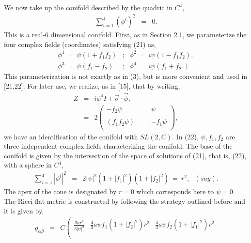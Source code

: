 \documentclass[a4paper,12pt]{article}
\begin{document}
{{\vspace{1.0cm}

{}

\vspace{0.5cm}

We now take up the conifold described by the quadric in $C^4$,
\begin{eqnarray}
\sum_{i=1}^{4} ({\phi}^i)^2 &=& 0.
\end{eqnarray}
This is a real-6 dimensional conifold. First, as in Section 2.1, we parameterize
the four complex fields (coordinates) satisfying (21) as,
\begin{eqnarray}
{\phi}^1\ =\ \psi(1+f_1f_2) &;& {\phi}^2\ =\ i\psi(1-f_1f_2), \nonumber \\
{\phi}^3 \ =\ \psi (f_1-f_2) &;& {\phi}^4 \ =\ i\psi(f_1+f_2.)
\end{eqnarray}
This parameterization is not exactly as in 
(3), but is more convenient and used in [21,22].  
For later use, we realize, as in [15], that 
by writing,
\begin{eqnarray}
Z&=& i{\phi}^4 I + \vec{\sigma} \cdot \vec{\phi}, \nonumber \\
 &=& 2 \left( \begin{array}{lccr} 
-f_2\psi & & & \psi \\
        &   & &  \\
(f_1f_2\psi) & & &  -f_1\psi \\
\end{array} \right), 
\end{eqnarray} 
we have an identification of the conifold with $SL(2,C)$.  
In (22), $\psi, f_1, f_2$ are three independent complex fields characterizing 
the conifold. The base of the conifold is given by the intersection of the 
space of solutions of (21), that is, (22), with a sphere in $C^4$,
\begin{eqnarray}
\sum_{i=1}^4 |{\phi}^i|^2 &=& 2 |\psi |^2 (1+ |f_1|^2)(1+ |f_2|^2)\ =\ r^2,
\ \ \ (say).
\end{eqnarray}
The apex of the cone is designated by $r=0$ which corresponds here to 
$\psi = 0$. The Ricci flat metric is constructed by following the strategy 
outlined before and it is given by,  
\begin{eqnarray}
g_{\alpha \bar{\beta}}&=&C\left( \begin{array}{l|c|r}
\frac{2ar^4}{3|\psi|^2} & \frac{4}{3}a\bar{\psi}f_1(1+|f_2|^2)r^2 &
\frac{4}{3} a\bar{\psi}f_2(1+|f_1|^2)r^2 \\
 & & \\

\end{array}
\end{eqnarray}}}
\end{document}
